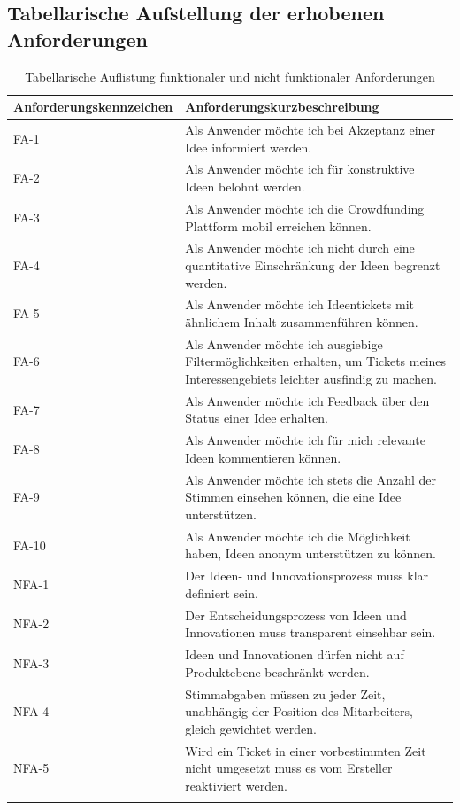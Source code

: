 \subsection{Tabellarische Aufstellung der erhobenen Anforderungen}\label{sec:anforderungen_tabellarisch}

\begin{longtable}[h]{|l|p{10cm}|}
\hline
Anforderungskennzeichen & Anforderungskurzbeschreibung \\
\hline
FA-1\label{itm:FA-1} & Als Anwender möchte ich bei Akzeptanz einer Idee informiert werden.\\
\hline
FA-2 & Als Anwender möchte ich für konstruktive Ideen belohnt werden.\\
\hline
FA-3 & Als Anwender möchte ich die Crowdfunding Plattform mobil erreichen können.\\
\hline
FA-4 & Als Anwender möchte ich nicht durch eine quantitative Einschränkung der Ideen begrenzt werden.\\
\hline
FA-5 & Als Anwender möchte ich Ideentickets mit ähnlichem Inhalt zusammenführen können.\\
\hline
FA-6 & Als Anwender möchte ich ausgiebige Filtermöglichkeiten erhalten, um Tickets meines Interessengebiets leichter ausfindig zu machen.\\
\hline
FA-7 & Als Anwender möchte ich Feedback über den Status einer Idee erhalten.\\
\hline
FA-8 & Als Anwender möchte ich für mich relevante Ideen kommentieren können.\\
\hline
FA-9 & Als Anwender möchte ich stets die Anzahl der Stimmen einsehen können, die eine Idee unterstützen.\\
\hline
FA-10 & Als Anwender möchte ich die Möglichkeit haben, Ideen anonym unterstützen zu können.\\
\hline
NFA-1 & Der Ideen- und Innovationsprozess muss klar definiert sein.\\
\hline
NFA-2 & Der Entscheidungsprozess von Ideen und Innovationen muss transparent einsehbar sein.\\
\hline
NFA-3 & Ideen und Innovationen dürfen nicht auf Produktebene beschränkt werden.\\
\hline
NFA-4 & Stimmabgaben müssen zu jeder Zeit, unabhängig der Position des Mitarbeiters, gleich gewichtet werden. \\
\hline
NFA-5 & Wird ein Ticket in einer vorbestimmten Zeit nicht umgesetzt muss es vom Ersteller reaktiviert werden. \\
\hline
\caption{Tabellarische Auflistung funktionaler und nicht funktionaler Anforderungen}\label{tab:Anforderungsanalyse}
\end{longtable}











